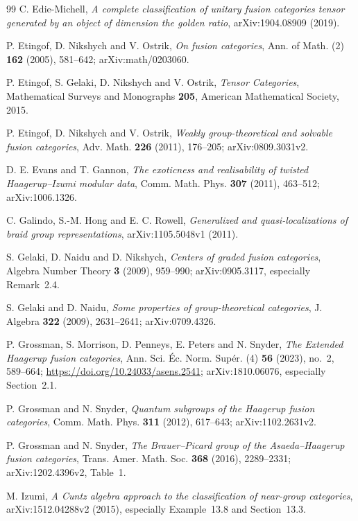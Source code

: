 \begin{thebibliography}{99}
C. Edie-Michell, \emph{A complete classification of unitary fusion categories tensor generated by an object of dimension the golden ratio}, arXiv:1904.08909 (2019).

P. Etingof, D. Nikshych and V. Ostrik, \emph{On fusion categories}, Ann. of Math. (2) \textbf{162} (2005), 581--642; arXiv:math/0203060.

P. Etingof, S. Gelaki, D. Nikshych and V. Ostrik, \emph{Tensor Categories}, Mathematical Surveys and Monographs \textbf{205}, American Mathematical Society, 2015.

P. Etingof, D. Nikshych and V. Ostrik, \emph{Weakly group-theoretical and solvable fusion categories}, Adv. Math. \textbf{226} (2011), 176--205; arXiv:0809.3031v2.

D. E. Evans and T. Gannon, \emph{The exoticness and realisability of twisted Haagerup--Izumi modular data}, Comm. Math. Phys. \textbf{307} (2011), 463--512; arXiv:1006.1326.

C. Galindo, S.-M. Hong and E. C. Rowell, \emph{Generalized and quasi-localizations of braid group representations}, arXiv:1105.5048v1 (2011).

S. Gelaki, D. Naidu and D. Nikshych,
\emph{Centers of graded fusion categories}, Algebra Number Theory
\textbf{3} (2009), 959--990; arXiv:0905.3117, especially Remark~2.4.

S. Gelaki and D. Naidu, \emph{Some properties of group-theoretical categories}, J. Algebra \textbf{322} (2009), 2631--2641; arXiv:0709.4326.

P. Grossman, S. Morrison, D. Penneys, E. Peters and N. Snyder,
\emph{The Extended Haagerup fusion categories}, Ann. Sci. \'Ec. Norm. Sup\'er.
(4) \textbf{56} (2023), no.~2, 589--664;
\url{https://doi.org/10.24033/asens.2541}; arXiv:1810.06076,
especially Section~2.1.

P. Grossman and N. Snyder, \emph{Quantum subgroups of the Haagerup fusion categories}, Comm. Math. Phys. \textbf{311} (2012), 617--643; arXiv:1102.2631v2.

P. Grossman and N. Snyder, \emph{The Brauer--Picard group of the Asaeda--Haagerup fusion categories}, Trans. Amer. Math. Soc. \textbf{368} (2016), 2289--2331; arXiv:1202.4396v2, Table~1.

M. Izumi, \emph{A Cuntz algebra approach to the classification of near-group categories}, arXiv:1512.04288v2 (2015), especially Example~13.8 and Section~13.3.


\end{thebibliography}
